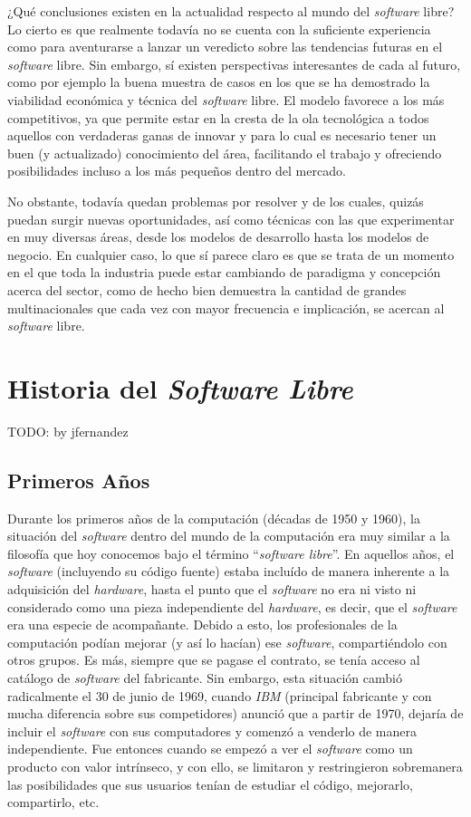 ¿Qué conclusiones existen en la actualidad respecto al mundo del
\textit{software} libre? Lo cierto es que realmente todavía no se cuenta con la
suficiente experiencia como para aventurarse a lanzar un veredicto sobre las
tendencias futuras en el \textit{software} libre. Sin embargo, sí existen
perspectivas interesantes de cada al futuro, como por ejemplo la buena muestra
de casos en los que se ha demostrado la viabilidad económica y técnica del
\textit{software} libre. El modelo favorece a los más competitivos, ya que
permite estar en la cresta de la ola tecnológica a todos aquellos con verdaderas
ganas de innovar y para lo cual es necesario tener un buen (y actualizado)
conocimiento del área, facilitando el trabajo y ofreciendo posibilidades incluso
a los más pequeños dentro del mercado.

No obstante, todavía quedan problemas por resolver y de los cuales, quizás
puedan surgir nuevas oportunidades, así como técnicas con las que experimentar
en muy diversas áreas, desde los modelos de desarrollo hasta los modelos de
negocio. En cualquier caso, lo que sí parece claro es que se trata de un momento
en el que toda la industria puede estar cambiando de paradigma y concepción
acerca del sector, como de hecho bien demuestra la cantidad de grandes
multinacionales que cada vez con mayor frecuencia e implicación, se acercan al
\textit{software} libre.

\section{Historia del \textit{Software Libre}}

TODO: by jfernandez

\subsection{Primeros Años}

Durante los primeros años de la computación (décadas de 1950 y 1960), la
situación del \textit{software} dentro del mundo de la computación era muy
similar a la filosofía que hoy conocemos bajo el término ``\textit{software
libre}''. En aquellos años, el \textit{software} (incluyendo su código fuente)
estaba incluído de manera inherente a la adquisición del \textit{hardware},
hasta el punto que el \textit{software} no era ni visto ni considerado como una
pieza independiente del \textit{hardware}, es decir, que el \textit{software}
era una especie de acompañante. Debido a esto, los profesionales de la
computación podían mejorar (y así lo hacían) ese \textit{software},
compartiéndolo con otros grupos. Es más, siempre que se pagase el contrato, se
tenía acceso al catálogo de \textit{software} del fabricante. Sin embargo, esta
situación cambió radicalmente el 30 de junio de 1969, cuando \textit{IBM}
(principal fabricante y con mucha diferencia sobre sus competidores) anunció que
a partir de 1970, dejaría de incluir el \textit{software} con sus computadores y
comenzó a venderlo de manera independiente. Fue entonces cuando se empezó a ver
el \textit{software} como un producto con valor intrínseco, y con ello, se
limitaron y restringieron sobremanera las posibilidades que sus usuarios tenían
de estudiar el código, mejorarlo, compartirlo, etc.

